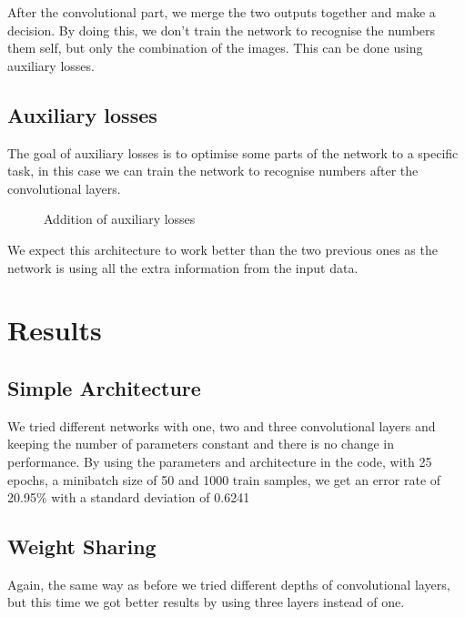 \documentclass{article}
\begin{document}
After the convolutional part, we merge the two outputs together and make a decision. By doing this, we don't train the network to recognise the numbers them self, but only the combination of the images. This can be done using auxiliary losses. 

\subsection{Auxiliary losses}

The goal of auxiliary losses is to optimise some parts of the network to a specific task, in this case we can train the network to recognise numbers after the convolutional layers. 

\begin{figure}[H]
\caption{Addition of auxiliary losses}
\end{figure}

We expect this architecture to work better than the two previous ones as the network is using all the extra information from the input data. 


\section{Results}

\subsection{Simple Architecture}
We tried different networks with one, two and three convolutional layers and keeping the number of parameters constant and there is no change in performance. By using the parameters and architecture in the code, with 25 epochs, a minibatch size of 50 and 1000 train samples, we get an error rate of 20.95\% with a standard deviation of 0.6241

\subsection{Weight Sharing}

Again, the same way as before we tried different depths of convolutional layers, but this time we got better results by using three layers instead of one. 
\end{document}
